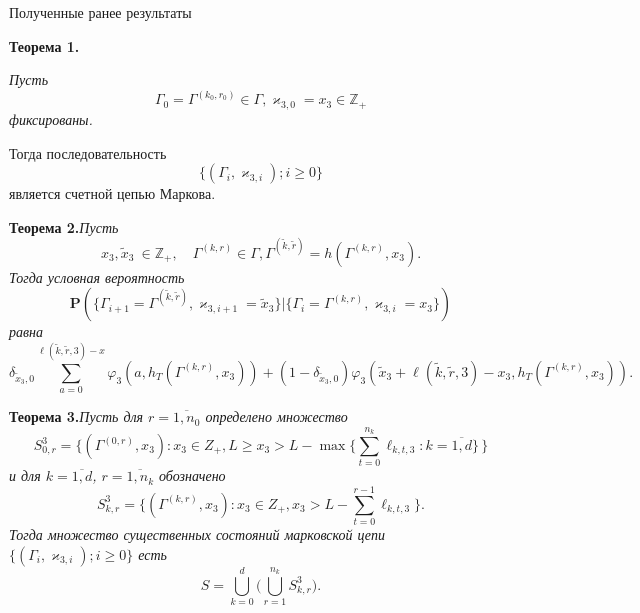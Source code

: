 \documentclass[10pt]{beamer}
\newcommand{\backupend}{
   \addtocounter{framenumberappendix}{-\value{framenumber}}
   \addtocounter{framenumber}{\value{framenumberappendix}} 
}
\begin{document}
\begin{frame}[allowframebreaks]{Полученные ранее результаты}

\begin{block}
    {\bf Теорема 1.} {\it 
    Пусть $$\Gamma_0=\Gamma^{(k_0,r_0)} \in \Gamma,  \varkappa_{3,0}=x_3\in \mathbb{Z}_+$$ фиксированы. 
    
    Тогда последовательность $$\{(\Gamma_i, \varkappa_{3,i}); i \geqslant 0\}$$ является счетной цепью Маркова.}
\end{block}
\framebreak
\begin{block}
    {\bf Теорема 2.}{\it Пусть 
    $$x_3, \tilde{x}_3~\in \mathbb{Z}_+, \quad \Gamma^{(k,r)}\in \Gamma, \Gamma^{(\tilde{k},\tilde{r})}= h(\Gamma^{(k,r)},x_3).$$ Тогда условная вероятность 
$${\mathbf P}(\{\Gamma_{i+1}=\Gamma^{(\tilde{k},\tilde{r})},\varkappa_{3,i+1}=\tilde{x}_3\}|\{\Gamma_{i}=\Gamma^{(k,r)},\varkappa_{3,i}=x_3\})$$ равна
$$\delta_{\tilde{x}_3,0}\!\sum_{a=0}^{\ell(\tilde{k},\tilde{r},3)-x} \varphi_3(a,h_T(\Gamma^{(k,r)},x_3)) + (1-\delta_{\tilde{x}_3,0}) \varphi_3(\tilde{x}_3 + \ell(\tilde{k},\tilde{r},3)-x_3,h_T(\Gamma^{(k,r)},x_3)).$$}
\end{block}
\framebreak
\begin{block}
    {\bf Теорема 3.}{\it Пусть для $r=\overline{1,n_0}$ определено множество $$S^3_{0,r} =\bigl\{(\Gamma^{(0,r)},x_3)  \colon x_3\in Z_+,  L \geqslant x_3 > L - \max\bigl\{\sum_{t=0}^{n_k} \ell_{k,t,3}\colon k=\overline{1,d}\bigr\}\,\bigr\}
$$ и  для $k=\overline{1,d}$, $r=\overline{1,n_k}$ обозначено $$S^3_{k,r} =  \{(\Gamma^{(k,r)},x_3) \colon x_3\in Z_+, x_3 > L - \sum_{t=0}^{r-1} \ell_{k,t,3}\}.$$ Тогда множество существенных состояний марковской цепи $\{(\Gamma_i, \varkappa_{3,i}); i \geqslant 0\}$ есть $$S=\bigcup_{k=0}^d \bigl(\bigcup_{r=1}^{n_k} S^3_{k,r}\bigr).$$}
\end{block}

\end{frame}
\backupend
\end{document}
